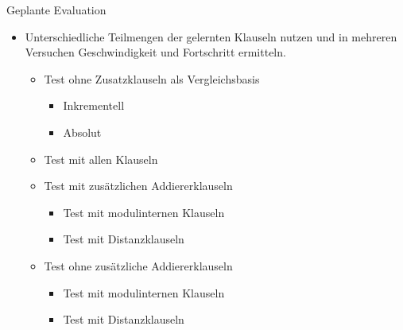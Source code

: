 \documentclass{beamer}
\begin{document}
    \begin{frame}{Geplante Evaluation}
      \begin{itemize}
        \item Unterschiedliche Teilmengen der gelernten Klauseln nutzen und in mehreren Versuchen Geschwindigkeit und Fortschritt ermitteln.
        \begin{itemize}
          \item Test ohne Zusatzklauseln als Vergleichsbasis
          \begin{itemize}
            \item Inkrementell
            \item Absolut
          \end{itemize}
          \item Test mit allen Klauseln
          \item Test mit zusätzlichen Addiererklauseln
          \begin{itemize}
            \item Test mit modulinternen Klauseln
            \item Test mit Distanzklauseln
          \end{itemize}
          \item Test ohne zusätzliche Addiererklauseln
          \begin{itemize}
            \item Test mit modulinternen Klauseln
            \item Test mit Distanzklauseln
          \end{itemize}
        \end{itemize}
      \end{itemize}
    \end{frame}
\end{document}
